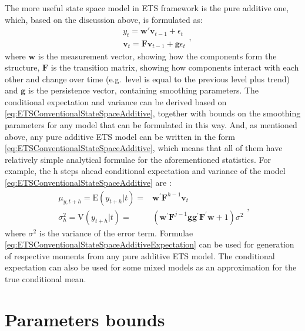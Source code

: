 \documentclass[
]{book}
\theoremstyle{definition}
\theoremstyle{definition}
\theoremstyle{definition}
\theoremstyle{definition}
\theoremstyle{remark}
\begin{document}
The more useful state space model in ETS framework is the pure additive one, which, based on the discussion above, is formulated as:
\begin{equation}
  \begin{aligned}
  & {y}_{t} = \mathbf{w}' \mathbf{v}_{t-1} + \epsilon_t \\
  & \mathbf{v}_{t} = \mathbf{F} \mathbf{v}_{t-1} + \mathbf{g} \epsilon_t
  \end{aligned},
  \label{eq:ETSConventionalStateSpaceAdditive}
\end{equation}
where \(\mathbf{w}\) is the measurement vector, showing how the components form the structure, \(\mathbf{F}\) is the transition matrix, showing how components interact with each other and change over time (e.g.~level is equal to the previous level plus trend) and \(\mathbf{g}\) is the persistence vector, containing smoothing parameters. The conditional expectation and variance can be derived based on \eqref{eq:ETSConventionalStateSpaceAdditive}, together with bounds on the smoothing parameters for any model that can be formulated in this way. And, as mentioned above, any pure additive ETS model can be written in the form \eqref{eq:ETSConventionalStateSpaceAdditive}, which means that all of them have relatively simple analytical formulae for the aforementioned statistics. For example, the h steps ahead conditional expectation and variance of the model \eqref{eq:ETSConventionalStateSpaceAdditive} are \citep[Chapter 6]{Hyndman2008b}:
\begin{equation}
  \begin{aligned}
    \mu_{y,t+h} = \text{E}(y_{t+h}|t) = & \mathbf{w}^\prime \mathbf{F}^{h-1} \mathbf{v}_{t} \\
    \sigma^2_{h} = \text{V}(y_{t+h}|t) = & \left(\mathbf{w}^\prime \mathbf{F}^{j-1} \mathbf{g} \mathbf{g}^\prime \mathbf{F}^\prime \mathbf{w} + 1 \right) \sigma^2
  \end{aligned},
  \label{eq:ETSConventionalStateSpaceAdditiveExpectation}
\end{equation}
where \(\sigma^2\) is the variance of the error term. Formulae \eqref{eq:ETSConventionalStateSpaceAdditiveExpectation} can be used for generation of respective moments from any pure additive ETS model. The conditional expectation can also be used for some mixed models as an approximation for the true conditional mean.

\hypertarget{ETSParametersBounds}{%
\section{Parameters bounds}\label{ETSParametersBounds}}
\end{document}
